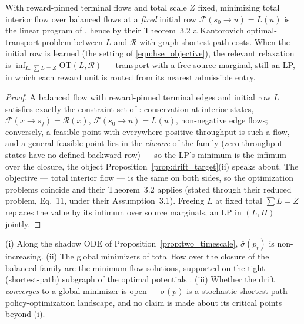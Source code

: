 \begin{lemma}\label{lem:normalization}
With reward-pinned terminal flows and total scale $Z$ fixed, minimizing total interior
flow over balanced flows at a \emph{fixed} initial row $\mathcal F(s_0\to u)=L(u)$ is the
linear program of \citet[Eq.~10]{maksimov2026ot}, hence by their Theorem~3.2 a Kantorovich
optimal-transport problem between $L$ and $\mathcal R$ with graph shortest-path costs.
When the initial row is learned (the setting of \eqref{equ:hse_objective}), the relevant
relaxation is $\inf_{L:\,\sum L=Z}\mathrm{OT}(L,\mathcal R)$ --- transport with a free
source marginal, still an LP, in which each reward unit is routed from its nearest
admissible entry.
\end{lemma}

\begin{proof}
A balanced flow with reward-pinned terminal edges and initial row $L$ satisfies exactly
the constraint set of \citet[Eq.~10]{maksimov2026ot}: conservation at interior states,
$\mathcal F(x\to s_f)=\mathcal R(x)$, $\mathcal F(s_0\to u)=L(u)$, non-negative edge
flows; conversely, a feasible point with everywhere-positive throughput is such a flow,
and a general feasible point lies in the \emph{closure} of the family (zero-throughput
states have no defined backward row) --- so the LP's minimum is the infimum over the
closure, the object Proposition~\ref{prop:drift_target}(ii) speaks about. The objective
--- total interior flow --- is the same on both sides, so the optimization problems
coincide and their Theorem~3.2 applies (stated through their reduced problem, Eq.~11,
under their Assumption~3.1). Freeing $L$ at fixed total $\sum L=Z$ replaces the value
by its infimum over source marginals, an LP in $(L,\Pi)$ jointly.
\end{proof}

\begin{proposition}\label{prop:drift_target}
(i) Along the shadow ODE of Proposition~\ref{prop:two_timescale}, $\bar\sigma(p_t)$ is
non-increasing. (ii) The global minimizers of total flow over the closure of the balanced
family are the minimum-flow solutions, supported on the tight (shortest-path) subgraph of
the optimal potentials \citep[Thms~3.2--3.3]{maksimov2026ot}. (iii) Whether the drift
\emph{converges} to a global minimizer is open --- $\bar\sigma(p)$ is a
stochastic-shortest-path policy-optimization landscape, and no claim is made about its
critical points beyond (i).
\end{proposition}

